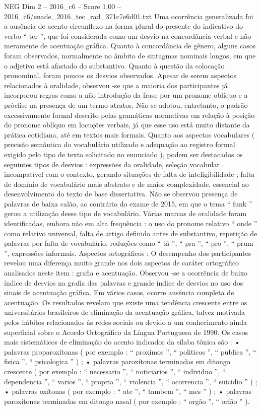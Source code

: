 \begin{textsample}{NEG Dim 2 – 2016\_c6 – Score 1.00 – 2016\_c6/enade\_2016\_tec\_rad\_371c7e6d01.txt}
Uma ocorrência generalizada foi a ausência de acento circunflexo na forma plural do presente do indicativo do verbo “ ter ”, que foi considerada como um desvio na concordância verbal e não meramente de acentuação gráfica.
Quanto à concordância de gênero, alguns casos foram observados, normalmente no âmbito de sintagmas nominais longos, em que o adjetivo está afastado do substantivo.
Quanto à questão da colocação pronominal, foram poucos os desvios observados.
Apesar de serem aspectos relacionados à oralidade, observou -se que a maioria dos participantes já incorporou regras como a não introdução da frase por um pronome oblíquo e a próclise na presença de um termo atrator.
Não se adotou, entretanto, o padrão excessivamente formal descrito pelas gramáticas normativas em relação à posição do pronome oblíquo em locuções verbais, já que esse uso está muito distante da prática cotidiana, até em textos mais formais.
Quanto aos aspectos vocabulares ( precisão semântica do vocabulário utilizado e adequação ao registro formal exigido pelo tipo de texto solicitado no enunciado ), podem ser destacados os seguintes tipos de desvios : expressões da oralidade, seleção vocabular incompatível com o contexto, gerando situações de falta de inteligibilidade ; falta de domínio de vocabulário mais abstrato e de maior complexidade, essencial ao desenvolvimento do texto de base dissertativa.
Não se observou presença de palavras de baixa calão, ao contrário do exame de 2015, em que o tema “ funk ” gerou a utilização desse tipo de vocabulário.
Várias marcas de oralidade foram identificadas, embora não em alta frequência : o uso do pronome relativo “ onde ” como relativo universal, falta de artigo definido antes de substantivo, repetição de palavras por falta de vocabulário, reduções como “ tá ”, “ pra ”, “ pro ”, “ prum ”, expressões informais.
Aspectos ortográficos : O desempenho dos participantes revelou uma diferença muito grande nos dois aspectos de caráter ortográfico analisados neste item : grafia e acentuação.
Observou -se a ocorrência de baixo índice de desvios na grafia das palavras e grande índice de desvios no uso dos sinais de acentuação gráfica.
Em vários casos, ocorre ausência completa de acentuação.
Os resultados revelam que existe uma tendência crescente entre os universitários brasileiros de eliminação da acentuação gráfica, talvez motivada pelos hábitos relacionados às redes sociais ou devido a um conhecimento ainda superficial sobre o Acordo Ortográfico da Língua Portuguesa de 1990.
Os casos mais sistemáticos de eliminação do acento indicador da sílaba tônica são : • palavras proparoxítonas ( por exemplo : “ proximos ”, “ politicos ”, “ publica ”, “ fisica ”, “ psicologica ” ) ; • palavras paroxítonas terminadas em ditongo crescente ( por exemplo : “ necessario ”, “ noticiarios ”, “ individuo ”, “ dependencia ”, “ varios ”, “ propria ”, “ violencia ”, “ ocorrencia ”, “ suicidio ” ) ; • palavras oxítonas ( por exemplo : “ ate ”, “ tambem ”, “ mes ” ) ; • palavras paroxítonas terminadas em ditongo nasal ( por exemplo : “ orgão ”, “ orfão ” ).

\end{textsample}
